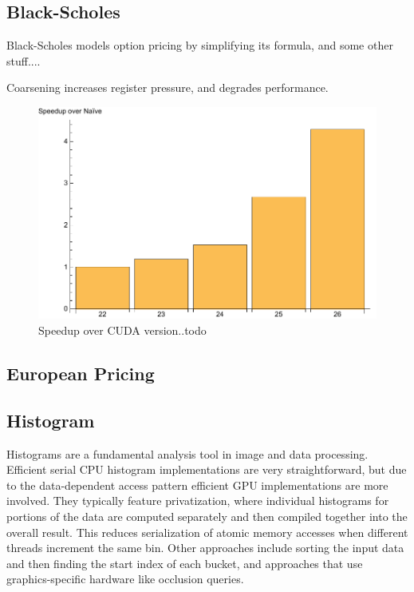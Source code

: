 \subsection{Black-Scholes}
Black-Scholes models option pricing by simplifying its formula, and some other stuff....


Coarsening increases register pressure, and degrades performance.


\begin{figure}
\centering
\includegraphics[scale=0.5]{data/blackscholes.pdf}
\caption{Speedup over CUDA version..todo}
\label{fig:blackscholes}
\centering
\end{figure}


\subsection{European Pricing}


\subsection{Histogram}
Histograms are a fundamental analysis tool in image and data processing.
Efficient serial CPU histogram implementations are very straightforward, but
due to the data-dependent access pattern efficient GPU implementations are
more involved. They typically feature privatization,
where individual histograms for portions of the data are computed separately
and then compiled together into the overall result. This reduces serialization
of atomic memory accesses when different threads increment the same bin.
Other approaches include sorting the input data and then finding the start
index of each bucket, and approaches that use graphics-specific hardware like
occlusion queries.

